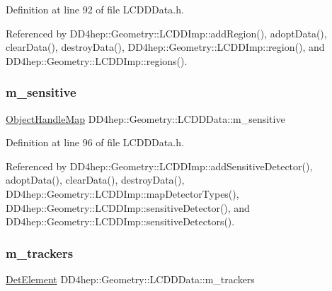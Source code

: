 Definition at line 92 of file L\+C\+D\+D\+Data.\+h.



Referenced by D\+D4hep\+::\+Geometry\+::\+L\+C\+D\+D\+Imp\+::add\+Region(), adopt\+Data(), clear\+Data(), destroy\+Data(), D\+D4hep\+::\+Geometry\+::\+L\+C\+D\+D\+Imp\+::region(), and D\+D4hep\+::\+Geometry\+::\+L\+C\+D\+D\+Imp\+::regions().

\hypertarget{class_d_d4hep_1_1_geometry_1_1_l_c_d_d_data_af86c69b812506c4e4543c7a845b040d0}{}\label{class_d_d4hep_1_1_geometry_1_1_l_c_d_d_data_af86c69b812506c4e4543c7a845b040d0} 
\subsubsection{\texorpdfstring{m\+\_\+sensitive}{m\_sensitive}}
{\footnotesize\ttfamily \hyperlink{class_d_d4hep_1_1_geometry_1_1_l_c_d_d_data_1_1_object_handle_map}{Object\+Handle\+Map} D\+D4hep\+::\+Geometry\+::\+L\+C\+D\+D\+Data\+::m\+\_\+sensitive\hspace{0.3cm}{\ttfamily [protected]}}



Definition at line 96 of file L\+C\+D\+D\+Data.\+h.



Referenced by D\+D4hep\+::\+Geometry\+::\+L\+C\+D\+D\+Imp\+::add\+Sensitive\+Detector(), adopt\+Data(), clear\+Data(), destroy\+Data(), D\+D4hep\+::\+Geometry\+::\+L\+C\+D\+D\+Imp\+::map\+Detector\+Types(), D\+D4hep\+::\+Geometry\+::\+L\+C\+D\+D\+Imp\+::sensitive\+Detector(), and D\+D4hep\+::\+Geometry\+::\+L\+C\+D\+D\+Imp\+::sensitive\+Detectors().

\hypertarget{class_d_d4hep_1_1_geometry_1_1_l_c_d_d_data_a0e76f8fc72b987e8b7e115fc7e9b7483}{}\label{class_d_d4hep_1_1_geometry_1_1_l_c_d_d_data_a0e76f8fc72b987e8b7e115fc7e9b7483} 
\subsubsection{\texorpdfstring{m\+\_\+trackers}{m\_trackers}}
{\footnotesize\ttfamily \hyperlink{class_d_d4hep_1_1_geometry_1_1_det_element}{Det\+Element} D\+D4hep\+::\+Geometry\+::\+L\+C\+D\+D\+Data\+::m\+\_\+trackers\hspace{0.3cm}{\ttfamily [protected]}}



